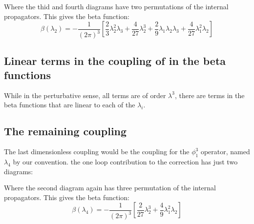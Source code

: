 \documentclass{article}
\begin{document}
Where the thid and fourth diagrams have two permutations of the internal propagators. This gives the beta function:
\begin{equation}
    \beta(\lambda_2) = -\frac{1}{(2\pi)^3}\left[\frac{2}{3}\lambda_2^2\lambda_3 + \frac{4}{27}\lambda_2^3 + 
    \frac{2}{9}\lambda_1\lambda_2\lambda_3 + \frac{4}{27}\lambda_1^2\lambda_2\right]
\end{equation}
\subsection{Linear terms in the coupling of in the beta functions}
While in the perturbative sense, all terms are of order $\lambda^3$, there are terms in the beta functions that are linear to each of the $\lambda_i$.
\subsection{The remaining coupling}
The last dimensionless coupling would be the coupling for the $\phi_1^3$ operator, named $\lambda_4$ by our convention. the one loop contribution to the correction has just two diagrams:
\begin{center}
\hspace{1cm}
\end{center}
Where the second diagram again has three permutation of the internal propagators. This gives the beta function:
\begin{equation}
    \beta(\lambda_4) = -\frac{1}{(2\pi)^3}\left[\frac{2}{27}\lambda_2^3 + \frac{4}{9}\lambda_1^2\lambda_2\right]
\end{equation}
\end{document}
